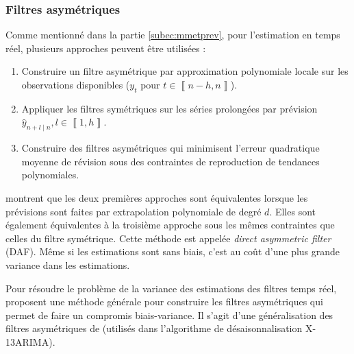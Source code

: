 \documentclass[
  12pt,
  french,
  12pt,a4paper]{article}
\newcommand\1{\mathds{1}}
\begin{document}
\hypertarget{subsec-lppasymf}{%
\subsubsection{Filtres asymétriques}\label{subsec-lppasymf}}

Comme mentionné dans la partie \ref{subec:mmetprev}, pour l'estimation en temps réel, plusieurs approches peuvent être utilisées :

\begin{enumerate}
\def\labelenumi{\arabic{enumi}.}
\item
  Construire un filtre asymétrique par approximation polynomiale locale sur les observations disponibles (\(y_{t}\) pour \(t\in\left\llbracket n-h,n\right\rrbracket\)).
\item
  Appliquer les filtres symétriques sur les séries prolongées par prévision \(\hat{y}_{n+l\mid n},l\in\left\llbracket 1,h\right\rrbracket\).
\item
  Construire des filtres asymétriques qui minimisent l'erreur quadratique moyenne de révision sous des contraintes de reproduction de tendances polynomiales.
\end{enumerate}

\textcite{proietti2008} montrent que les deux premières approches sont équivalentes lorsque les prévisions sont faites par extrapolation polynomiale de degré \(d\).
Elles sont également équivalentes à la troisième approche sous les mêmes contraintes que celles du filtre symétrique.
Cette méthode est appelée \emph{direct asymmetric filter} (DAF).
Même si les estimations sont sans biais, c'est au coût d'une plus grande variance dans les estimations.

Pour résoudre le problème de la variance des estimations des filtres temps réel, \textcite{proietti2008} proposent une méthode générale pour construire les filtres asymétriques qui permet de faire un compromis biais-variance.
Il s'agit d'une généralisation des filtres asymétriques de \textcite{musgrave1964set} (utilisés dans l'algorithme de désaisonnalisation X-13ARIMA).
\end{document}
